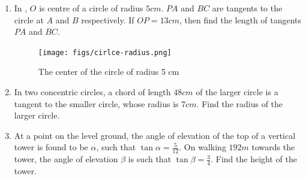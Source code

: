 \begin{enumerate}[label=\arabic*.,ref=\theenumi]
    \item In , $O$ is centre of a circle of radius $5 cm$. $PA$ and $BC$ are tangents to the circle at $A$ and $B$ respectively. If $OP = 13 cm$, then find the length of tangents $PA$ and $BC$.
     \begin{figure}[H]
        \centering
        \texttt{[image: figs/cirlce-radius.png]}
        \caption{The center of the circle of radius 5 cm}
	     \label{fig:fig4.png}
    \end{figure}
    
    \item In two concentric circles, a chord of length $48 cm$ of the larger
circle is a tangent to the smaller circle, whose radius is $7 cm$. Find the radius of the larger circle. 
    \item At a point on the level ground, the angle of elevation of the top
of a vertical tower is found to be $\alpha$, such that $\tan \alpha =\frac{5}{12} $. On walking $192 m$ towards the tower, the angle of elevation $\beta$ is such that $\tan \beta=\frac{3}{4}$. Find the height of the tower. 
    \end{enumerate}

